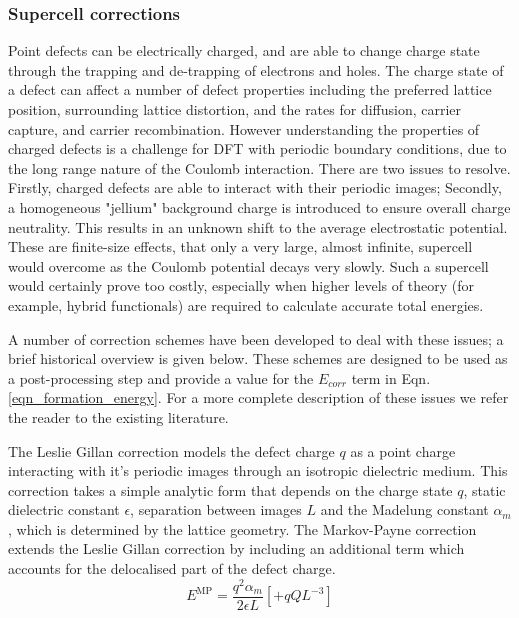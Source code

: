 
\subsubsection{Supercell corrections}
Point defects can be electrically charged, and are able to change charge state through the trapping and de-trapping of electrons and holes. 
The charge state of a defect can affect a number of defect properties including the preferred lattice position, surrounding lattice distortion, and the rates for diffusion, carrier capture, and carrier recombination.
However understanding the properties of charged defects is a challenge for DFT with periodic boundary conditions, due to the long range nature of the Coulomb interaction.
There are two issues to resolve. 
Firstly, charged defects are able to interact with their periodic images; 
Secondly, a homogeneous "jellium" background charge is introduced to ensure overall charge neutrality. This results in an unknown shift to the average electrostatic potential. 
These are finite-size effects, that only a very large, almost infinite, supercell would overcome as the Coulomb potential decays very slowly.
Such a supercell would certainly prove too costly, especially when higher levels of theory (for example, hybrid functionals) are required to calculate accurate total energies.

A number of correction schemes have been developed to deal with these issues; a brief historical overview is given below. These schemes are designed to be used as a post-processing step and provide a value for the $E_{corr}$ term in Eqn.\ref{eqn_formation_energy}. For a more complete description of these issues we refer the reader to the existing literature.\cite{durrant2018,Vinichenko2017}

The Leslie Gillan correction\cite{Leslie1985} models the defect charge $q$ as a point charge interacting with it's periodic images through an isotropic dielectric medium. 
This correction takes a simple analytic form that depends on the charge state  $q$, static dielectric constant $\epsilon$, separation between images $L$ and the Madelung constant $\alpha_m$, which is determined by the lattice geometry.
The Markov-Payne correction extends the Leslie Gillan correction by including an additional term which accounts for the delocalised part of the defect charge. 
\begin{equation}
    E^\mathrm{MP} = \frac{q^2\alpha_{m}}{2\epsilon L} [+ qQL^{-3}]
\end{equation}

